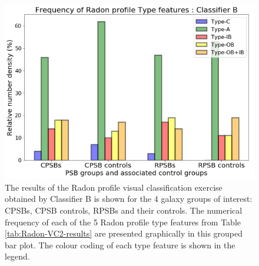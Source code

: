 \begin{figure}
    \centering
    \includegraphics[width=\columnwidth]{images/JupyterPlots/PROFILE-TYPES-CLASSIFIER-B.png}
    \caption[Radon profile Type classifications determined by Classifier B]{The results of the Radon profile visual classification exercise obtained by Classifier B is shown for the 4 galaxy groups of interest: CPSBs, CPSB controls, RPSBs and their controls. The numerical frequency of each of the 5 Radon profile type features from Table \ref{tab:Radon-VC2-results} are presented graphically in this grouped bar plot. The colour coding of each type feature is shown in the legend.}
    \label{fig:Radon-grouped-barchart-B}
\end{figure}

